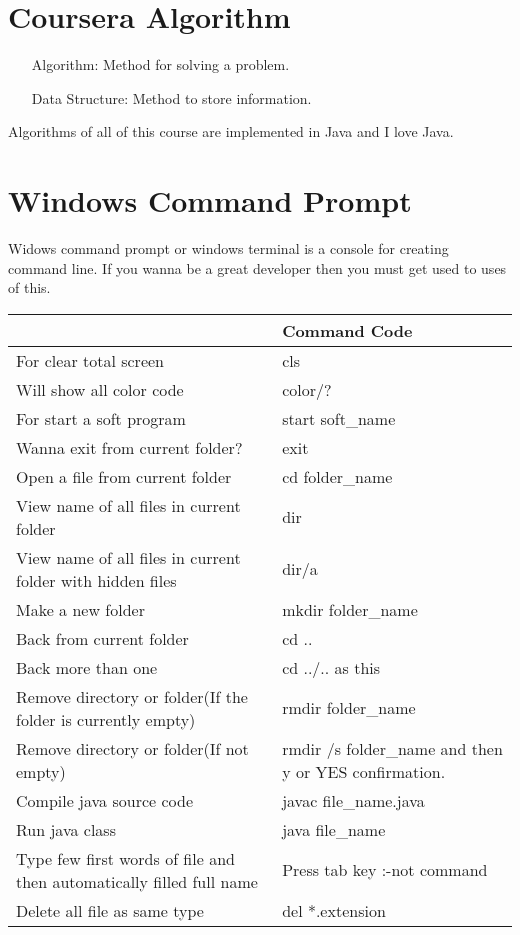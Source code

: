 \documentclass[11 pt]{book}
\begin{document}
\chapter{Coursera Algorithm}
\begin{itemize}
	\item[Algorithm: ] Method for solving a problem.
	\item[Data Structure: ] Method to store information.
\end{itemize}
Algorithms of all of this course are implemented in Java and I love Java. 

\chapter{Windows Command Prompt}
Widows command prompt or windows terminal is a console for creating command line. If you wanna be a great developer then you must get used to uses of this.\\
\begin{center}
	\begin{tabularx}{0.9\textwidth}
	{|>{\raggedright\arraybackslash}X
	 |>{\raggedleft\arraybackslash}X	
	|}
		\hline
		{\color{red}Task}& {\color{red}Command Code}\\
		\hline
		\hline
		For clear total screen & cls\\
		\hline
		Will show all color code & color/?\\
		\hline
		For start a soft program & start soft\_name\\
		\hline
		Wanna exit from current folder? & exit\\
		\hline
		Open a file from current folder & cd folder\_name\\
		\hline
		View name of all files in current folder & dir\\
		\hline
		View name of all files in current folder with hidden files & dir/a\\
		\hline
		Make a new folder & mkdir folder\_name\\
		\hline
		Back from current folder & cd ..\\
		\hline
		Back more than one & cd ../.. as this\\
		\hline
		Remove directory or folder(If the folder is currently empty) & rmdir folder\_name\\
		\hline
		Remove directory or folder(If not empty) & rmdir /s folder\_name and then y or YES confirmation.\\
		\hline
		Compile java source code & javac file\_name.java\\
		\hline
		Run java class & java file\_name\\
		\hline
		Type few first words of file and then automatically filled full name & Press tab key :-not command\\
		\hline
		Delete all file as same type & del *.extension\\
		\hline
		
	\end{tabularx}
\end{center}
\end{document}
